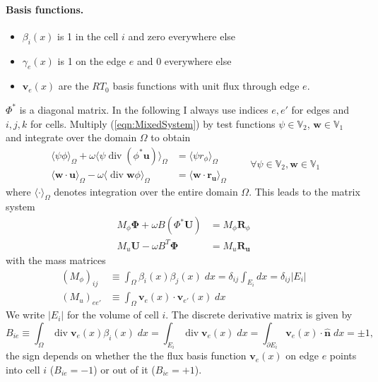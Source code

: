 \documentclass[12pt]{article}
\renewcommand{\vec}[1]{\boldsymbol{#1}}
\newcommand{\divergence}{\operatorname{div}}
\newcommand{\intOmega}[1]{\langle#1\rangle_{\Omega}}
\newcommand{\Vpressure}{\mathbb{V}_2}
\newcommand{\Vvelocity}{\mathbb{V}_1}
\begin{document}
\paragraph{Basis functions.}
\begin{itemize}
  \item $\beta_i(x)$ is 1 in the cell $i$ and zero everywhere else
	\item $\gamma_e(x)$ is 1 on the edge $e$ and 0 everywhere else
  \item $\vec{v}_e(x)$ are the $RT_0$ basis functions with unit flux through edge $e$.
\end{itemize}
$\Phi^*$ is a diagonal matrix. In the following I always use indices $e,e'$ for edges and $i,j,k$ for cells.
Multiply (\ref{eqn:MixedSystem}) by test functions $\psi\in \Vpressure$, $\vec{w}\in\Vvelocity$ and integrate over the domain $\Omega$ to obtain 
\begin{equation}
 \begin{aligned}
  \intOmega{\psi \phi} + \omega \intOmega{\psi \divergence(\phi^* \vec{u})} &= 
  \intOmega{\psi r_{\phi}} \\
  \intOmega{\vec{w}\cdot\vec{u}} - \omega \intOmega{\divergence \vec{w} \phi} &= \intOmega{\vec{w}\cdot \vec{r}_{\vec{u}}}
 \end{aligned}
 \qquad\forall{\psi\in\Vpressure, \vec{w}\in\Vvelocity}
\end{equation}
where $\intOmega{\cdot}$ denotes integration over the entire domain $\Omega$.
This leads to the matrix system
\begin{equation}
 \begin{aligned}
  M_{\phi} \vec{\Phi} + \omega B (\Phi^* \vec{U}) &= M_{\phi}\vec{R}_\phi \\
  M_{u} \vec{U} - \omega B^T \vec{\Phi} &= M_u \vec{R}_{\vec{u}}
 \end{aligned}
\label{eqn:MatrixSystem}
\end{equation}
with the mass matrices
\begin{equation}
 \begin{aligned}
  \left(M_{\phi}\right)_{ij} &\equiv \int_{\Omega} \beta_{i}(x)\beta_j(x)\;dx = \delta_{ij} \int_{E_i} dx = \delta_{ij} |E_i| \\
  \left(M_{u}\right)_{ee'} &\equiv \int_{\Omega} \vec{v}_e(x)\cdot \vec{v}_{e'}(x)\; dx
 \end{aligned}
\end{equation}
We write $|E_i|$ for the volume of cell $i$. The discrete derivative matrix is given by
\begin{equation}
  B_{ie} \equiv \int_{\Omega} \divergence \vec{v}_e(x) \beta_i(x)\; dx = \int_{E_i} \divergence \vec{v}_e(x) \;dx = \int_{\partial E_i} \vec{v}_e(x)\cdot \hat{\vec{n}} \; dx = \pm 1,
\end{equation}
the sign depends on whether the the flux basis function $\vec{v}_e(x)$ on edge $e$ points into cell $i$ ($B_{ie} = -1$) or out of it ($B_{ie}=+1$).
\end{document}

